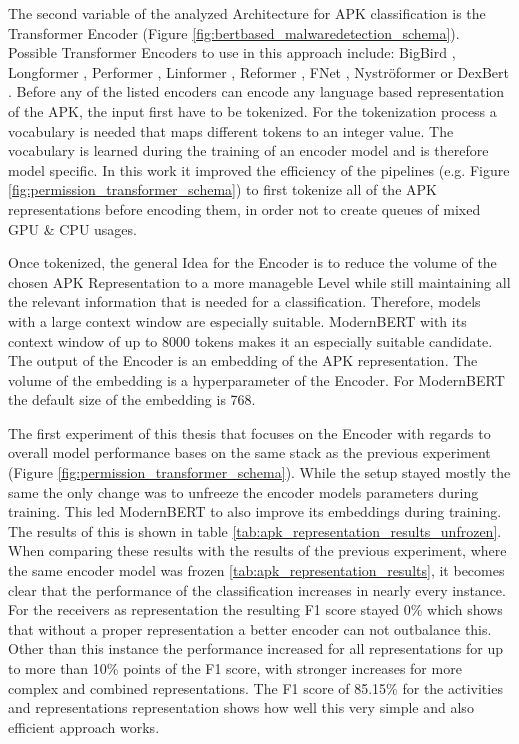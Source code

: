 The second variable of the analyzed Architecture for 
APK classification is the Transformer Encoder 
(Figure \ref{fig:bertbased_malwaredetection_schema}).
Possible Transformer Encoders to use in this approach include: 
BigBird \cite{bigbird}, Longformer \cite{longformer}, 
Performer \cite{performer}, Linformer \cite{linformer},
Reformer \cite{reformer}, FNet \cite{fnet}, 
Nyströformer \cite{nystromformer} or DexBert \cite{dexbert}.
Before any of the listed encoders can encode any language based representation
of the APK, the input first have to be tokenized.
For the tokenization process a vocabulary is needed that maps different tokens
to an integer value. The vocabulary is learned during the training of an encoder model 
and is therefore model specific. In this work it improved the efficiency of 
the pipelines (e.g. Figure \ref{fig:permission_transformer_schema}) 
to first tokenize all of the APK representations before encoding them, 
in order not to create queues of mixed GPU \& CPU usages.

Once tokenized, the general Idea for the Encoder is to reduce the volume of the chosen
APK Representation to a more manageble Level while still maintaining all 
the relevant information that is needed for a classification.
Therefore, models with a large context window are especially suitable.
ModernBERT \cite{modernbert} with its context window of up to 8000 tokens
makes it an especially suitable candidate.
The output of the Encoder is an embedding of the APK representation.
The volume of the embedding is a hyperparameter of the Encoder.
For ModernBERT the default size of the embedding is 768.

The first experiment of this thesis that focuses on the Encoder with regards
to overall model performance bases on the same stack as the previous experiment
(Figure \ref{fig:permission_transformer_schema}).
While the setup stayed mostly the same the only change was to unfreeze the 
encoder models parameters during training. This led ModernBERT to 
also improve its embeddings during training. The results of this is shown in 
table \ref{tab:apk_representation_results_unfrozen}. When comparing these 
results with the results of the previous experiment, where the same 
encoder model was frozen \ref{tab:apk_representation_results}, it becomes 
clear that the performance of the classification increases in nearly every instance.
For the receivers as representation the resulting F1 score stayed 0\% which shows
that without a proper representation a better encoder can not outbalance this.
Other than this instance the performance increased for all representations
for up to more than 10\% points of the F1 score, with stronger increases for
more complex and combined representations. The F1 score of 85.15\% for the 
activities and representations representation shows how well this very simple
and also efficient approach works.

